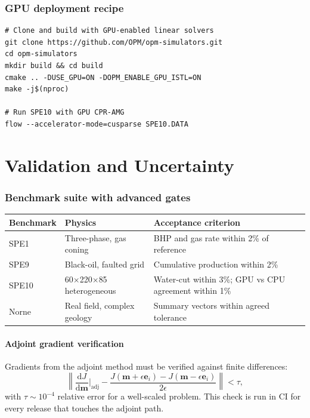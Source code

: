 \documentclass[10pt,a4paper]{article}
\newcommand{\dd}{\mathrm{d}}
\begin{document}
\section{GPU deployment recipe}

\begin{lstlisting}[style=sh, caption={Building OPM Flow with GPU support.}]
# Clone and build with GPU-enabled linear solvers
git clone https://github.com/OPM/opm-simulators.git
cd opm-simulators
mkdir build && cd build
cmake .. -DUSE_GPU=ON -DOPM_ENABLE_GPU_ISTL=ON
make -j$(nproc)

# Run SPE10 with GPU CPR-AMG
flow --accelerator-mode=cusparse SPE10.DATA
\end{lstlisting}

\part{Validation and Uncertainty}

\section{Benchmark suite with advanced gates}

\begin{longtable}{@{}p{2.0cm}p{5.2cm}p{6.8cm}@{}}
\toprule
\textbf{Benchmark} & \textbf{Physics} & \textbf{Acceptance criterion}\\
\midrule
\endhead
SPE1 & Three-phase, gas coning & BHP and gas rate within 2\% of reference\\
SPE9 & Black-oil, faulted grid & Cumulative production within 2\%\\
SPE10 & 60$\times$220$\times$85 heterogeneous & Water-cut within 3\%; GPU vs CPU agreement within 1\%\\
Norne & Real field, complex geology & Summary vectors within agreed tolerance\\
\bottomrule
\end{longtable}

\subsection{Adjoint gradient verification}

Gradients from the adjoint method must be verified against finite differences:
\begin{equation}
  \left\|\frac{\dd J}{\dd \bm{m}}\bigg|_{\text{adj}}
        - \frac{J(\bm{m}+\epsilon\bm{e}_i)-J(\bm{m}-\epsilon\bm{e}_i)}{2\epsilon}\right\|
  < \tau,
  \label{eq:grad-check}
\end{equation}
with $\tau\sim10^{-4}$ relative error for a well-scaled problem. This check is
run in CI for every release that touches the adjoint path.
\end{document}
